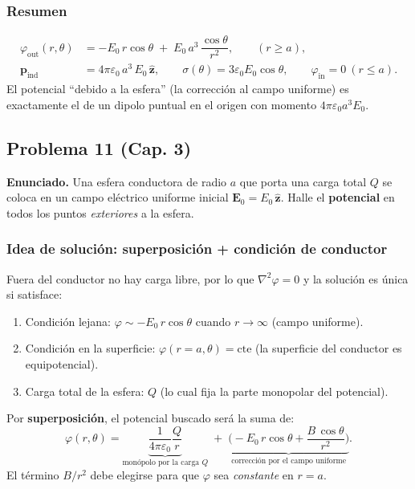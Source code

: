 \documentclass{article}
\begin{document}
\subsubsection*{Resumen}
\[
\boxed{
\begin{aligned}
\varphi_{\text{out}}(r,\theta)&=-E_0\,r\cos\theta\;+\;E_0\,a^{3}\,\dfrac{\cos\theta}{r^{2}},\qquad (r\ge a),\\[4pt]
\mathbf p_{\text{ind}}&=4\pi\varepsilon_0\,a^{3}\,E_0\,\hat{\mathbf z},\qquad
\sigma(\theta)=3\varepsilon_0 E_0\cos\theta,\qquad
\varphi_{\text{in}}=0\ (r\le a).
\end{aligned}}
\]
El potencial “debido a la esfera” (la corrección al campo uniforme) es exactamente el de un dipolo puntual en el origen con momento $4\pi\varepsilon_0 a^{3}E_0$.


\subsection{Problema 11 (Cap. 3)} \vspace{0.5cm}

\textbf{Enunciado.} Una esfera conductora de radio $a$ que porta una carga total $Q$ se coloca en un campo eléctrico uniforme inicial $\mathbf E_0=E_0\,\hat{\mathbf z}$. Halle el \textbf{potencial} en todos los puntos \emph{exteriores} a la esfera.

\subsubsection*{Idea de solución: superposición + condición de conductor}
Fuera del conductor no hay carga libre, por lo que $\nabla^2\varphi=0$ y la solución es única si satisface:
\begin{enumerate}
\item Condición lejana: $\varphi \sim -E_0\,r\cos\theta$ cuando $r\to\infty$ (campo uniforme).
\item Condición en la superficie: $\varphi(r=a,\theta)=\text{cte}$ (la superficie del conductor es equipotencial).
\item Carga total de la esfera: $Q$ (lo cual fija la parte monopolar del potencial).
\end{enumerate}

Por \textbf{superposición}, el potencial buscado será la suma de:
\[
\varphi(r,\theta)=\underbrace{\frac{1}{4\pi\varepsilon_0}\frac{Q}{r}}_{\text{monópolo por la carga $Q$}}
\;+\;\underbrace{\Big(-E_0\,r\cos\theta+\frac{B\,\cos\theta}{r^{2}}\Big)}_{\text{corrección por el campo uniforme}}.
\]
El término $B/r^2$ debe elegirse para que $\varphi$ sea \emph{constante} en $r=a$.
\end{document}
